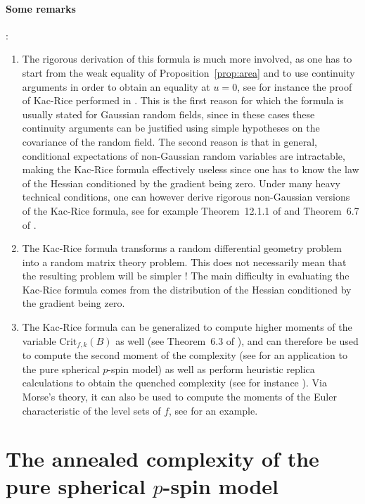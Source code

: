 \documentclass[amsmath,amssymb,nofootinbib,prd]{article}
\begin{document}
	\paragraph{Some remarks}:
	\begin{enumerate}
	\item The rigorous derivation of this formula is much more involved, as one has to start from the weak equality of Proposition~\ref{prop:area} and to use continuity arguments in order to obtain an equality at $u = 0$, see for instance the proof of Kac-Rice performed in \cite{azais2009level}.
	This is the first reason for which the formula is usually stated for Gaussian random fields, since in these cases these continuity arguments can be justified using simple hypotheses on the covariance of the random field.
	The second reason is that in general, conditional expectations of non-Gaussian random variables are intractable, making the Kac-Rice formula effectively useless since one has to know the law of the Hessian conditioned by the gradient being zero.
	 Under many heavy technical conditions, one can however derive rigorous non-Gaussian versions of the Kac-Rice formula, see for example Theorem~12.1.1 of \cite{adler2009random} and Theorem~6.7 of \cite{azais2009level}.
	\item The Kac-Rice formula transforms a random differential geometry problem into a random matrix theory problem.
	This does not necessarily mean that the resulting problem will be simpler !
	The main difficulty in evaluating the Kac-Rice formula comes from the distribution of the Hessian conditioned by the gradient being zero.
	\item The Kac-Rice formula can be generalized to compute higher moments of the variable $\mathrm{Crit}_{f,k}(B)$ as well (see Theorem~6.3 of \cite{azais2009level}), and can therefore be used to compute the second moment of the complexity (see \cite{subag2017complexity} for an application to the pure spherical $p$-spin model) as well as perform heuristic replica calculations to obtain the quenched complexity (see for instance \cite{ros2019complex}).
	Via Morse's theory, it can also be used to compute the moments of the Euler characteristic of the level sets of $f$, see \cite{auffinger2013complexity} for an example.
	\end{enumerate}
	
	\section{The annealed complexity of the pure spherical \texorpdfstring{$p$}{p}-spin model}
	
\end{document}
